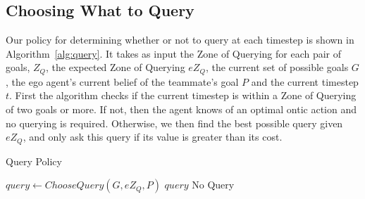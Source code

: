 \documentclass[letterpaper]{article}
\begin{document}
\subsection{Choosing What to Query}


Our policy for determining whether or not to query at each timestep is shown in Algorithm~\ref{alg:query}. It takes as input the Zone of Querying for each pair of goals, $Z_Q$, the expected Zone of Querying $eZ_Q$, the current set of possible goals $G$, the ego agent’s current belief of the teammate’s goal $P$ and the current timestep $t$. First the algorithm checks if the current timestep is within a Zone of Querying of two goals or more. If not, then the agent knows of an optimal ontic action and no querying is required. Otherwise, we then find the best possible query given $eZ_Q$, and only ask this query if its value is greater than its cost.
\begin{algorithm}[t]
\caption{Query Policy}
\begin{algorithmic}
\State $query \gets ChooseQuery(G, eZ_Q, P)$
\State \Return $query$
\EndIf
\EndIf
\State \Return No Query
\EndProcedure
\end{algorithmic}
\label{alg:query}
\end{algorithm}
\end{document}
